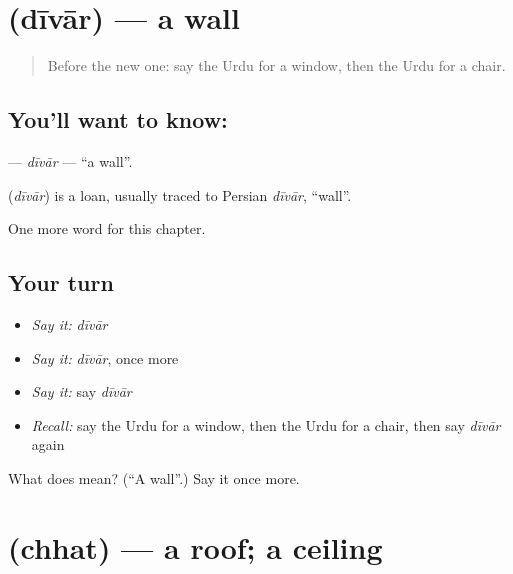 \section[\texorpdfstring{\ur{دیوار} (dīvār)}{دیوار (dīvār)}]{ (dīvār) — a wall}

\label{lesson:UR-C58-divar}



\begin{quote}
Before the new one: say the Urdu for a window, then the Urdu for a chair.
\end{quote}

\subsection*{You'll want to know: }
\textbf{} — \emph{dīvār} — \textquotedblleft{}a wall\textquotedblright{}.

\begin{cousinweb}
\textbf{} (\emph{dīvār}) is a loan, usually traced to Persian \emph{dīvār}, \textquotedblleft{}wall\textquotedblright{}.
\end{cousinweb}

\begin{grammarlens}[title={What you've built}]
One more word for this chapter.
\end{grammarlens}

\subsection*{Your turn}
\begin{itemize}
\raggedright
  \item \emph{Say it:} \emph{dīvār}
  \item \emph{Say it:} \emph{dīvār}, once more
  \item \emph{Say it:} say \emph{dīvār}
  \item \emph{Recall:} say the Urdu for a window, then the Urdu for a chair, then say \emph{dīvār} again
\end{itemize}

\begin{tcolorbox}[breakable,colback=teal!4,colframe=teal!35!black,title={Before you move on}]
What does  mean? (\textquotedblleft{}A wall\textquotedblright{}.) Say it once more.
\end{tcolorbox}
\section[\texorpdfstring{\ur{چھت} (chhat)}{چھت (chhat)}]{ (chhat) — a roof; a ceiling}

